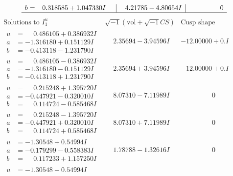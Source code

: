 \documentclass[1p]{elsarticle_modified}
\theoremstyle{definition}
\newcommand{\I}{\sqrt{-1}}
\begin{document}
$$\begin{array}{c|c|c}
\begin{aligned}
b &= \phantom{-}0.318585 + 1.047330 I\end{aligned}
 & \phantom{-}4.21785 - 4.80654 I & \phantom{-0.000000 } 0\\
 \hline 
 \end{array}$$\newpage$$\begin{array}{c|c|c}  
\text{Solutions to }I^u_{1}& \I (\text{vol} + \sqrt{-1}CS) & \text{Cusp shape}\\
 \hline 
\begin{aligned}
u &= \phantom{-}0.486105 + 0.386932 I \\
a &= -1.316180 + 0.151129 I \\
b &= -0.413118 - 1.231790 I\end{aligned}
 & \phantom{-}2.35694 - 3.94596 I & -12.00000 + 0. I\phantom{ +0.000000I} \\ \hline\begin{aligned}
u &= \phantom{-}0.486105 - 0.386932 I \\
a &= -1.316180 - 0.151129 I \\
b &= -0.413118 + 1.231790 I\end{aligned}
 & \phantom{-}2.35694 + 3.94596 I & -12.00000 + 0. I\phantom{ +0.000000I} \\ \hline\begin{aligned}
u &= \phantom{-}0.215248 + 1.395720 I \\
a &= -0.447921 - 0.320010 I \\
b &= \phantom{-}0.114724 - 0.585468 I\end{aligned}
 & \phantom{-}8.07310 - 7.11989 I & \phantom{-0.000000 } 0 \\ \hline\begin{aligned}
u &= \phantom{-}0.215248 - 1.395720 I \\
a &= -0.447921 + 0.320010 I \\
b &= \phantom{-}0.114724 + 0.585468 I\end{aligned}
 & \phantom{-}8.07310 + 7.11989 I & \phantom{-0.000000 } 0 \\ \hline\begin{aligned}
u &= -1.30548 + 0.54994 I \\
a &= -0.179299 - 0.558383 I \\
b &= \phantom{-}0.117233 + 1.157250 I\end{aligned}
 & \phantom{-}1.78788 - 1.32616 I & \phantom{-0.000000 } 0 \\ \hline\begin{aligned}
u &= -1.30548 - 0.54994 I \\

\end{aligned}
\end{array}$$
\end{document}
